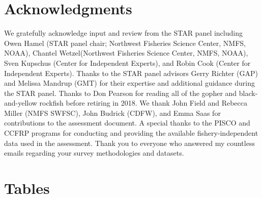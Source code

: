 \documentclass[12pt,]{article}
\begin{document}
\section{Acknowledgments}\label{acknowledgments}

We gratefully acknowledge input and review from the STAR panel including
Owen Hamel (STAR panel chair; Northwest Fisheries Science Center, NMFS,
NOAA), Chantel Wetzel(Northwest Fisheries Science Center, NMFS, NOAA),
Sven Kupschus (Center for Independent Experts), and Robin Cook (Center
for Independent Experts). Thanks to the STAR panel advisors Gerry
Richter (GAP) and Melissa Mandrup (GMT) for their expertise and
additional guidance during the STAR panel. Thanks to Don Pearson for
reading all of the gopher and black-and-yellow rockfish before retiring
in 2018. We thank John Field and Rebecca Miller (NMFS SWFSC), John
Budrick (CDFW), and Emma Saas for contributions to the assessment
document. A special thanks to the PISCO and CCFRP programs for
conducting and providing the available fishery-independent data used in
the assessment. Thank you to everyone who answered my countless emails
regarding your survey methodologies and datasets.

\newpage

\FloatBarrier

\section{Tables}\label{tables}

\FloatBarrier
\end{document}
